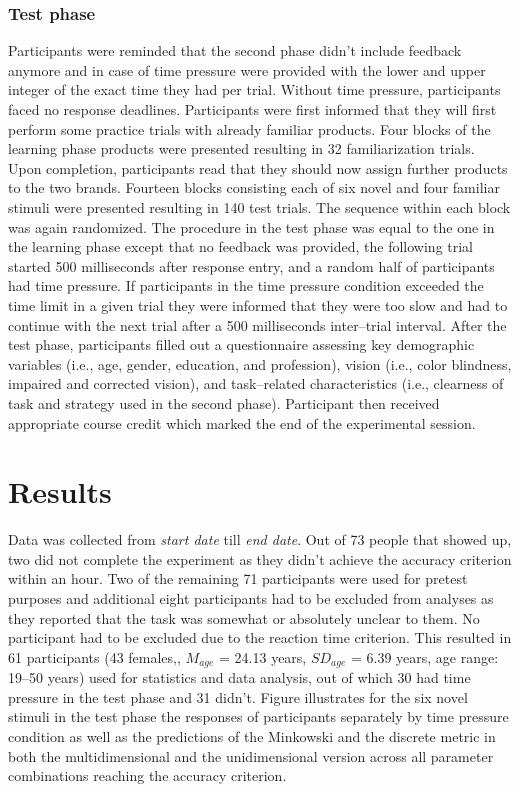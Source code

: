 \documentclass[a4paper,man,natbib]{apa6}
\begin{document}
\subsubsection{Test phase}
Participants were reminded that the second phase didn't include feedback anymore and in case of time pressure were provided with the lower and upper integer of the exact time they had per trial. Without time pressure, participants faced no response deadlines. Participants were first informed that they will first perform some practice trials with already familiar products. Four blocks of the learning phase products were presented resulting in 32 familiarization trials. Upon completion, participants read that they should now assign further products to the two brands. Fourteen blocks consisting each of six novel and four familiar stimuli were presented resulting in 140 test trials. The sequence within each block was again randomized. The procedure in the test phase was equal to the one in the learning phase except that no feedback was provided, the following trial started 500 milliseconds after response entry, and a random half of participants had time pressure. If participants in the time pressure condition exceeded the time limit in a given trial they were informed that they were too slow and had to continue with the next trial after a 500 milliseconds inter--trial interval. After the test phase, participants filled out a questionnaire assessing key demographic variables (i.e., age, gender, education, and profession), vision (i.e., color blindness, impaired and corrected vision), and task--related characteristics (i.e., clearness of task and strategy used in the second phase). Participant then received appropriate course credit which marked the end of the experimental session.

\section{Results}
Data was collected from \textit{start date} till \textit{end date}. Out of 73 people that showed up, two did not complete the experiment as they didn't achieve the accuracy criterion within an hour. Two of the remaining 71 participants were used for pretest purposes and additional eight participants had to be excluded from analyses as they reported that the task was somewhat or absolutely unclear to them. No participant had to be excluded due to the reaction time criterion. This resulted in 61 participants (43 females,, $M_{age}$ = 24.13 years, $SD_{age}$ = 6.39 years, age range: 19--50 years)  used for statistics and data analysis, out of which 30  had time pressure in the test phase and 31 didn't. Figure  illustrates for the six novel stimuli in the test phase the responses of participants separately by time pressure condition as well as the predictions of the Minkowski and the discrete metric in both the multidimensional and the unidimensional version across all parameter combinations reaching the accuracy criterion.
\end{document}
